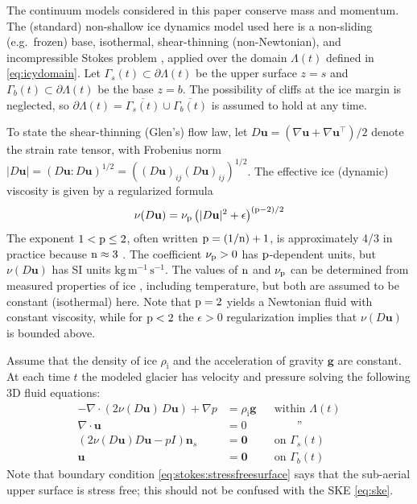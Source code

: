 \documentclass[hidelinks,onefignum,onetabnum,final]{siamart220329}  %
\newcommand{\eps}{\epsilon}
\newcommand{\grad}{\nabla}
\newcommand{\bg}{\mathbf{g}}
\newcommand{\bn}{\mathbf{n}}
\newcommand{\bu}{\mathbf{u}}
\newcommand{\bzero}{\bm{0}}
\newcommand{\nn}{{\text{\textnormal{n}}}}
\newcommand{\pp}{{\text{\textnormal{p}}}}
\newcommand{\rhoi}{\rho_{\text{i}}}
\begin{document}
The continuum models considered in this paper conserve mass and momentum.   The (standard) non-shallow ice dynamics model used here is a non-sliding (e.g.~frozen) base, isothermal, shear-thinning (non-Newtonian), and incompressible Stokes problem \cite{GreveBlatter2009,JouvetRappaz2011,SchoofHewitt2013}, applied over the domain $\Lambda(t)$ defined in \eqref{eq:icydomain}.  Let $\Gamma_s(t) \subset \partial \Lambda(t)$ be the upper surface $z=s$ and $\Gamma_b(t) \subset \partial \Lambda(t)$ be the base $z=b$.  The possibility of cliffs at the ice margin is neglected, so $\partial \Lambda(t) = \overline{\Gamma_s(t)} \cup \overline{\Gamma_b(t)}$ is assumed to hold at any time.

To state the shear-thinning (Glen's) flow law, let $D\bu=(\grad \bu + \grad \bu^{\top})/2$ denote the strain rate tensor, with Frobenius norm $|D\bu| = (D\bu:D\bu)^{1/2} = \left((D\bu)_{ij} (D\bu)_{ij}\right)^{1/2}$.  The effective ice (dynamic) viscosity \cite{GreveBlatter2009} is given by a regularized formula
\begin{equation}
\nu(D\bu) = \nu_\pp \left(|D\bu|^2 + \eps\right)^{(\pp-2)/2} \label{eq:glen}
\end{equation}
The exponent $1 < \pp \le 2$, often written $\pp=(1/\nn)+1$, is approximately 4/3 in practice because $\nn\approx 3$ \cite{GreveBlatter2009}.  The coefficient $\nu_\pp>0$ has $\pp$-dependent units, but $\nu(D\bu)$ has SI units $\text{kg}\,\text{m}^{-1}\,\text{s}^{-1}$.  The values of $\nn$ and $\nu_\pp$ can be determined from measured properties of ice \cite{GoldsbyKohlstedt2001,GreveBlatter2009}, including temperature, but both are assumed to be constant (isothermal) here.  Note that $\pp=2$ yields a Newtonian fluid with constant viscosity, while for $\pp < 2$ the $\eps>0$ regularization implies that $\nu(D\bu)$ is bounded above.

Assume that the density of ice $\rhoi$ and the acceleration of gravity $\bg$ are constant.  At each time $t$ the modeled glacier has velocity and pressure solving the following 3D fluid equations:
\begin{subequations}
\label{eq:stokes}
\begin{align}
- \nabla \cdot \left(2 \nu(D\bu)\, D\bu\right) + \nabla p &= \rhoi \bg && \text{within $\Lambda(t)$} \\
\nabla \cdot \bu &= 0 && \qquad \text{''} \label{eq:stokes:incomp} \\
\left(2 \nu(D\bu) D\bu - pI\right) \bn_s &= \bzero && \text{on $\Gamma_s(t)$}\label{eq:stokes:stressfreesurface} \\
\bu  &= \bzero && \text{on $\Gamma_b(t)$}
\end{align}
\end{subequations}
Note that boundary condition \eqref{eq:stokes:stressfreesurface} says that the sub-aerial upper surface is stress free; this should not be confused with the SKE \eqref{eq:ske}.
\end{document}
